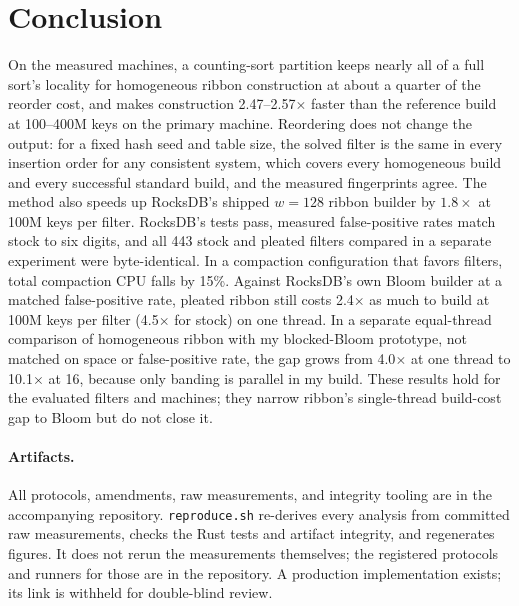\documentclass[a4paper,UKenglish,cleveref,autoref,thm-restate,anonymous]{lipics-v2021}
\begin{document}
\section{Conclusion}
On the measured machines, a counting-sort partition keeps nearly all of a full sort's locality for homogeneous ribbon construction at about a quarter of the reorder cost, and makes construction 2.47--2.57$\times$ faster than the reference build at 100--400M keys on the primary machine. Reordering does not change the output: for a fixed hash seed and table size, the solved filter is the same in every insertion order for any consistent system, which covers every homogeneous build and every successful standard build, and the measured fingerprints agree. The method also speeds up RocksDB's shipped $w=128$ ribbon builder by $1.8\times$ at 100M keys per filter. RocksDB's tests pass, measured false-positive rates match stock to six digits, and all 443 stock and pleated filters compared in a separate experiment were byte-identical. In a compaction configuration that favors filters, total compaction CPU falls by 15\%. Against RocksDB's own Bloom builder at a matched false-positive rate, pleated ribbon still costs 2.4$\times$ as much to build at 100M keys per filter (4.5$\times$ for stock) on one thread. In a separate equal-thread comparison of homogeneous ribbon with my blocked-Bloom prototype, not matched on space or false-positive rate, the gap grows from 4.0$\times$ at one thread to 10.1$\times$ at 16, because only banding is parallel in my build. These results hold for the evaluated filters and machines; they narrow ribbon's single-thread build-cost gap to Bloom but do not close it.

\paragraph*{Artifacts.}
All protocols, amendments, raw measurements, and integrity tooling are in the accompanying
repository. \texttt{reproduce.sh} re-derives every analysis from committed raw
measurements, checks the Rust tests and artifact integrity, and regenerates figures. It does not
rerun the measurements themselves; the registered protocols and runners for those are in the
repository. A production implementation exists; its link is withheld for double-blind review.



\appendix
\end{document}
